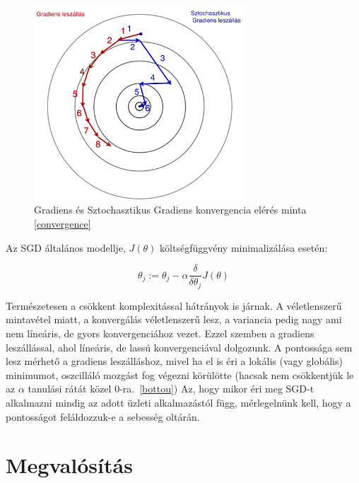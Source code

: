\documentclass[a4paper,12pt]{article}
\begin{document}
\begin{figure}[H]
\centering
\includegraphics[width=80mm]{img/sgd_bgd.png}
\caption{Gradiens és Sztochasztikus Gradiens konvergencia elérés minta \ref{convergence} \label{sgd_bgd}}
\end{figure}


Az SGD általános modellje, $J(\theta)$ költségfüggvény minimalizálása esetén:

\[\theta_j:=\theta_j-\alpha\frac{\delta}{\delta\theta_j}J(\theta)\]

Természetesen a csökkent komplexitással hátrányok is járnak. A véletlenszerű mintavétel miatt, a konvergálás véletlenszerű lesz, a variancia pedig nagy ami nem líneáris, de gyors konvergenciához vezet. Ezzel szemben a gradiens leszállással, ahol líneáris, de lassú konvergenciával dolgozunk. A pontossága sem lesz mérhető a gradiens leszálláshoz, mivel ha el is éri a lokális (vagy globális) minimumot, oszcilláló mozgást fog végezni körülötte (hacsak nem csökkentjük le az $\alpha$ tanulási rátát közel 0-ra.~\ref{bottou})
Az, hogy mikor éri meg SGD-t alkalmazni mindig az adott üzleti alkalmazástól függ, mérlegelnünk kell, hogy a pontosságot feláldozzuk-e a sebesség oltárán.


\section{Megvalósítás}
\end{document}
